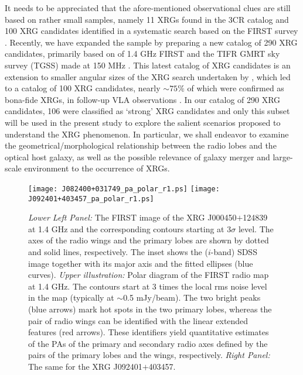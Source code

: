 \documentclass[twocolumn]{aastex62}
\begin{document}
It needs to be appreciated that the afore-mentioned observational clues are 
still based on rather small samples, namely 11 XRGs found in the 3CR catalog 
\citep{Leahy1992ersf.meet..307L} and 100 XRG candidates identified in a 
systematic search based on the FIRST survey \citep{Cheung2007AJ....133.2097C}. 
Recently, we have expanded the sample by preparing a new catalog of 290 XRG 
candidates, primarily based on of 1.4 GHz FIRST and the TIFR GMRT sky survey 
(TGSS) made at 150 MHz \citep{Yang2019arXiv190506356Y}. This latest catalog of 
XRG candidates is an extension to smaller angular sizes of the XRG search 
undertaken by \citet{Cheung2007AJ....133.2097C}, which led to a catalog of
100 XRG candidates, nearly $\sim 75\%$ of which were confirmed as bona-fide 
XRGs, in follow-up VLA observations \citep{Roberts2018ApJ...852...47R}. In 
our catalog of 290 XRG candidates, 106 were classified as `strong' XRG 
candidates and only this subset will be used in the present study to explore the 
salient scenarios proposed to understand the XRG phenomenon. In particular, we 
shall endeavor to examine the geometrical/morphological relationship between 
the radio lobes and the optical host galaxy, as well as the possible relevance 
of galaxy merger and large-scale environment to the occurrence of XRGs.

\begin{figure*}
\centering
\texttt{[image: J082400+031749\_pa\_polar\_r1.ps]}
\texttt{[image: J092401+403457\_pa\_polar\_r1.ps]}
  \caption{\emph{Lower Left Panel:} The FIRST image of the XRG
     J000450$+$124839 at 1.4 GHz and the corresponding contours
     starting at 3$\sigma$ level. The axes of the radio wings and the
     primary lobes are shown by dotted and solid lines, respectively.
     The inset shows the ($i$-band) SDSS image together with its major
     axis and the fitted ellipses (blue curves). \emph{Upper
       illustration:} Polar diagram of the FIRST radio map at 1.4 GHz.
     The contours start at 3 times the local rms noise level in the
     map (typically at $\sim$0.5 mJy/beam). The two bright peaks (blue
     arrows) mark hot spots in the two primary lobes, whereas the pair
     of radio wings can be identified with the linear extended
     features (red arrows). These identifiers yield quantitative
     estimates of the PAs of the primary and secondary radio axes
     defined by the pairs of the primary lobes and the wings,
     respectively. \emph{Right Panel:} The same for the XRG
     J092401$+$403457.}
 \label{fig:pa_img}
    \end{figure*}
\end{document}
